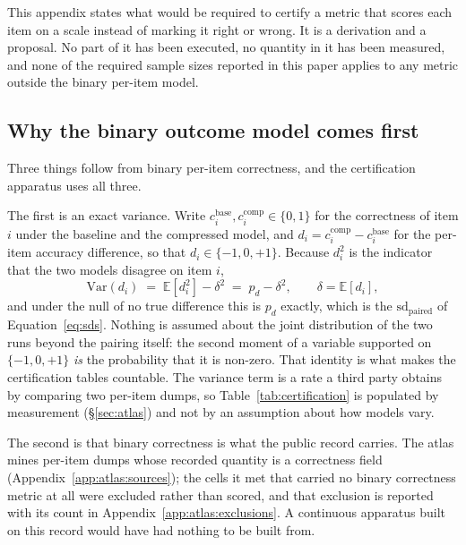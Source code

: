 This appendix states what would be required to certify a metric that scores each
item on a scale instead of marking it right or wrong. It is a derivation and a
proposal. No part of it has been executed, no quantity in it has been measured,
and none of the required sample sizes reported in this paper applies to any
metric outside the binary per-item model.

\subsection{Why the binary outcome model comes first}
\label{app:continuous:why}

Three things follow from binary per-item correctness, and the certification
apparatus uses all three.

The first is an exact variance. Write $c_i^{\mathrm{base}}, c_i^{\mathrm{comp}}
\in \{0,1\}$ for the correctness of item $i$ under the baseline and the
compressed model, and $d_i = c_i^{\mathrm{comp}} - c_i^{\mathrm{base}}$ for the
per-item accuracy difference, so that $d_i \in \{-1,0,+1\}$. Because $d_i^2$ is
the indicator that the two models disagree on item $i$,
\begin{equation}
\mathrm{Var}(d_i) \;=\; \mathbb{E}[d_i^2] - \delta^2 \;=\; p_d - \delta^2 ,
\qquad \delta = \mathbb{E}[d_i],
\label{eq:vard-binary}
\end{equation}
and under the null of no true difference this is $p_d$ exactly, which is the
$\mathrm{sd}_{\mathrm{paired}}$ of Equation~\eqref{eq:sds}. Nothing is assumed
about the joint distribution of the two runs beyond the pairing itself: the
second moment of a variable supported on $\{-1,0,+1\}$ \emph{is} the probability
that it is non-zero. That identity is what makes the certification tables
countable. The variance term is a rate a third party obtains by comparing two
per-item dumps, so Table~\ref{tab:certification} is populated by measurement
(\S\ref{sec:atlas}) and not by an assumption about how models vary.

The second is that binary correctness is what the public record carries. The
atlas mines per-item dumps whose recorded quantity is a correctness field
(Appendix~\ref{app:atlas:sources}); the cells it met that carried no binary
correctness metric at all were excluded rather than scored, and that exclusion
is reported with its count in Appendix~\ref{app:atlas:exclusions}. A continuous
apparatus built on this record would have had nothing to be built from.

